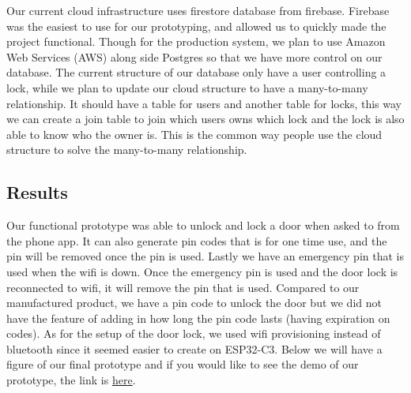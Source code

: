 Our current cloud infrastructure uses firestore database from firebase. Firebase was the easiest to use for our prototyping, and allowed us to quickly made the project functional. Though for the production system, we plan to use Amazon Web Services (AWS) along side Postgres so that we have more control on our database.  The current structure of our database only have a user controlling a lock, while we plan to update our cloud structure to have a many-to-many relationship. It should have a table for users and another table for locks, this way we can create a join table to join which users owns which lock and the lock is also able to know who the owner is. This is the common way people use the cloud structure to solve the many-to-many relationship.

\subsection{Results}

Our functional prototype was able to unlock and lock a door when asked to from the phone app. It can also generate pin codes that is for one time use, and the pin will be removed once the pin is used. Lastly we have an emergency pin that is used when the wifi is down. Once the emergency pin is used and the door lock is reconnected to wifi, it will remove the pin that is used. Compared to our manufactured product, we have a pin code to unlock the door but we did not have the feature of adding in how long the pin code lasts (having expiration on codes). As for the setup of the door lock, we used wifi provisioning instead of bluetooth since it seemed easier to create on ESP32-C3. Below we will have a figure of our final prototype and if you would like to see the demo of our prototype, the link is \href{https://youtu.be/XbD7zrFxasE?si=83Vg6o0KJSXbOtdF}{here}.